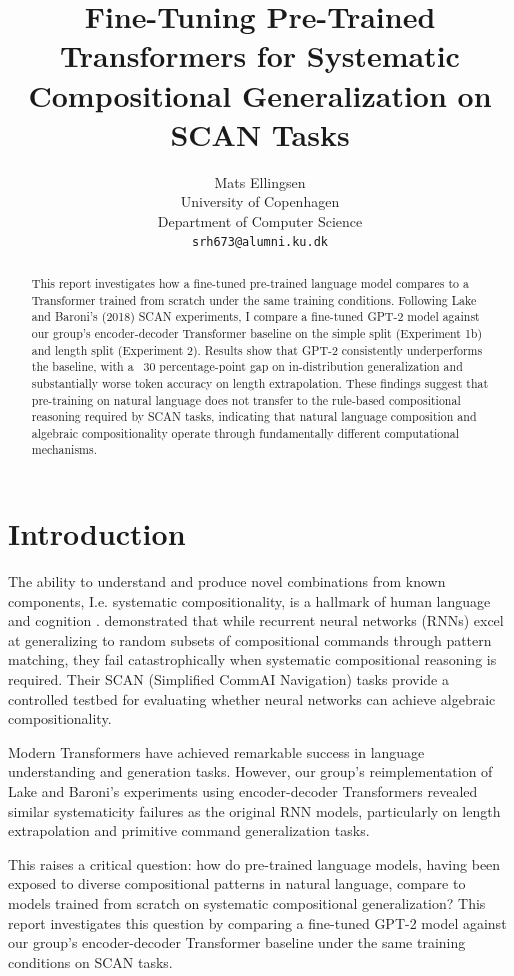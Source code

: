 \documentclass[11pt]{article}
\title{Fine-Tuning Pre-Trained Transformers for Systematic Compositional Generalization on SCAN Tasks}
\author{Mats Ellingsen \\
  University of Copenhagen \\
  Department of Computer Science \\
  \texttt{srh673@alumni.ku.dk}}
\begin{document}
\maketitle
\begin{abstract}
This report investigates how a fine-tuned pre-trained language model compares to a Transformer trained from scratch under the same training conditions. Following Lake and Baroni's (2018) SCAN experiments, I compare a fine-tuned GPT-2 model against our group's encoder-decoder Transformer baseline on the simple split (Experiment 1b) and length split (Experiment 2). Results show that GPT-2 consistently underperforms the baseline, with a ~30 percentage-point gap on in-distribution generalization and substantially worse token accuracy on length extrapolation. These findings suggest that pre-training on natural language does not transfer to the rule-based compositional reasoning required by SCAN tasks, indicating that natural language composition and algebraic compositionality operate through fundamentally different computational mechanisms.
\end{abstract}

\section{Introduction}

The ability to understand and produce novel combinations from known components, I.e. systematic compositionality, is a hallmark of human language and cognition \citep{Fodor:88}. \citet{lake2018generalizationsystematicitycompositionalskills} demonstrated that while recurrent neural networks (RNNs) excel at generalizing to random subsets of compositional commands through pattern matching, they fail catastrophically when systematic compositional reasoning is required. Their SCAN (Simplified CommAI Navigation) tasks provide a controlled testbed for evaluating whether neural networks can achieve algebraic compositionality.

Modern Transformers have achieved remarkable success in language understanding and generation tasks. However, our group's reimplementation of Lake and Baroni's experiments using encoder-decoder Transformers revealed similar systematicity failures as the original RNN models, particularly on length extrapolation and primitive command generalization tasks.

This raises a critical question: how do pre-trained language models, having been exposed to diverse compositional patterns in natural language, compare to models trained from scratch on systematic compositional generalization? This report investigates this question by comparing a fine-tuned GPT-2 model against our group's encoder-decoder Transformer baseline under the same training conditions on SCAN tasks.
\end{document}
